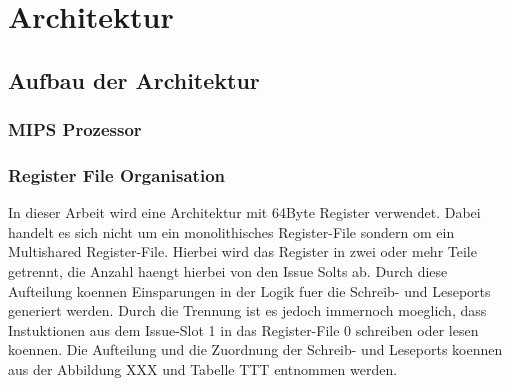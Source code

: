 \chapter{Architektur}
\label{chap:architecture}

\section{Aufbau der Architektur}
\label{chap:architecture_overview}

\subsection{MIPS Prozessor}
\subsection{Register File Organisation}
In dieser Arbeit wird eine Architektur mit 64Byte Register verwendet. Dabei handelt es sich nicht um ein monolithisches Register-File sondern om ein Multishared Register-File. Hierbei wird das Register in zwei oder mehr Teile getrennt, die Anzahl haengt hierbei von den Issue Solts ab. Durch diese Aufteilung koennen Einsparungen in der Logik fuer die Schreib- und Leseports generiert werden. Durch die Trennung ist es jedoch immernoch moeglich, dass Instuktionen aus dem Issue-Slot 1 in das Register-File 0 schreiben oder lesen koennen. Die Aufteilung und die Zuordnung der Schreib- und Leseports koennen aus der Abbildung XXX und Tabelle TTT entnommen werden.

\begin{figure}
	\centering
	
\end{figure}

